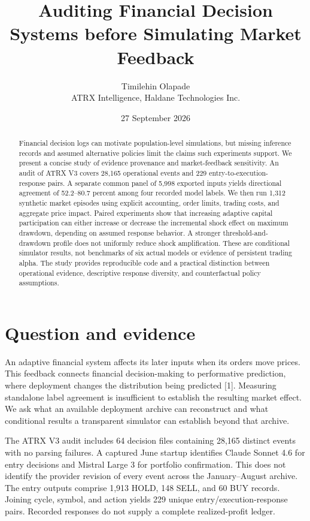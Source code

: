 \documentclass[10pt,letterpaper,twocolumn]{article}
\title{Auditing Financial Decision Systems before Simulating Market Feedback}
\author{Timilehin Olapade\\ATRX Intelligence, Haldane Technologies Inc.}
\date{27 September 2026}
\begin{document}
\maketitle
\begin{abstract}
Financial decision logs can motivate population-level simulations, but missing inference records and assumed alternative policies limit the claims such experiments support. We present a concise study of evidence provenance and market-feedback sensitivity. An audit of ATRX V3 covers 28,165 operational events and 229 entry-to-execution-response pairs. A separate common panel of 5,998 exported inputs yields directional agreement of 52.2--80.7 percent among four recorded model labels. We then run 1,312 synthetic market episodes using explicit accounting, order limits, trading costs, and aggregate price impact. Paired experiments show that increasing adaptive capital participation can either increase or decrease the incremental shock effect on maximum drawdown, depending on assumed response behavior. A stronger threshold-and-drawdown profile does not uniformly reduce shock amplification. These are conditional simulator results, not benchmarks of six actual models or evidence of persistent trading alpha. The study provides reproducible code and a practical distinction between operational evidence, descriptive response diversity, and counterfactual policy assumptions.
\end{abstract}

\section{Question and evidence}
An adaptive financial system affects its later inputs when its orders move prices. This feedback connects financial decision-making to performative prediction, where deployment changes the distribution being predicted [1]. Measuring standalone label agreement is insufficient to establish the resulting market effect. We ask what an available deployment archive can reconstruct and what conditional results a transparent simulator can establish beyond that archive.

The ATRX V3 audit includes 64 decision files containing 28,165 distinct events with no parsing failures. A captured June startup identifies Claude Sonnet 4.6 for entry decisions and Mistral Large 3 for portfolio confirmation. This does not identify the provider revision of every event across the January--August archive. The entry outputs comprise 1,913 HOLD, 148 SELL, and 60 BUY records. Joining cycle, symbol, and action yields 229 unique entry/execution-response pairs. Recorded responses do not supply a complete realized-profit ledger.
\end{document}
